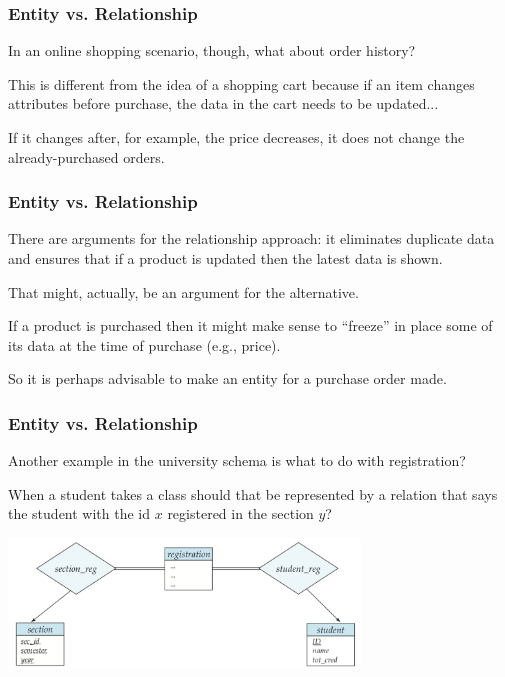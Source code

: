 \begin{frame}
\frametitle{Entity vs. Relationship}

In an online shopping scenario, though, what about order history? 

This is different from the idea of a shopping cart because if an item changes attributes before purchase, the data in the cart needs to be updated...

If it changes after, for example, the price decreases, it does not change the already-purchased orders.

\end{frame}



\begin{frame}
\frametitle{Entity vs. Relationship}

There are arguments for the relationship approach: it eliminates duplicate data and ensures that if a product is updated then the latest data is shown. 

That might, actually, be an argument for the alternative. 

If a product is purchased then it might make sense to ``freeze'' in place some of its data at the time of purchase (e.g., price).

So it is perhaps advisable to make an entity for a purchase order made. 

\end{frame}



\begin{frame}
\frametitle{Entity vs. Relationship}

Another example in the university schema is what to do with registration? 

When a student takes a class should that be represented by a relation that says the student with the id $x$ registered in the section $y$? 


\begin{center}
	\includegraphics[width=0.7\textwidth]{images/reg-split}
\end{center}

\end{frame}



